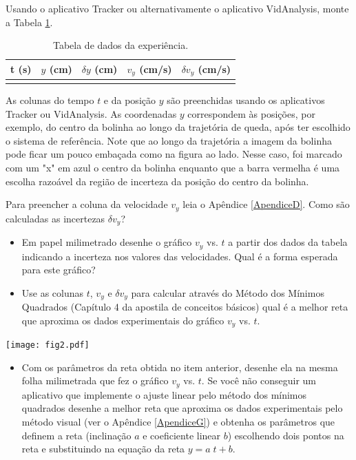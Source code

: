 \documentclass[12pt]{article}
\begin{document}
Usando o aplicativo Tracker ou alternativamente o aplicativo  VidAnalysis, monte a Tabela \ref{tabela1}.
\begin{table}[h!]
\centering
\begin{tabular}{c|c|c|c|c}
t (s) & $y$ (cm) & $\delta y$ (cm)& $v_y$ (cm/s)& $\delta v_y$ (cm/s)\\
\hline 
&&&& 
\end{tabular}
\caption{Tabela de dados da experiência.}
\label{tabela1}
\end{table}
\par
\begin{minipage}[c]{11.5cm}
\hskip 0.5cm
As colunas do tempo $t$ e da posição $y$ são preenchidas usando os aplicativos Tracker 
ou  VidAnalysis. As coordenadas $y$ correspondem às posições, por exemplo, do centro da bolinha ao longo da trajetória de queda, após ter escolhido o sistema de referência. Note que ao longo da trajetória a imagem da bolinha pode ficar um pouco embaçada como na figura ao lado. 
Nesse caso, foi marcado com um "x"  em azul 
o centro da bolinha enquanto que a barra vermelha é uma escolha razoável da região de incerteza
da posição do centro da bolinha.  
\par
\hskip 0.5cm
Para preencher a coluna da velocidade $v_y$ leia o Apêndice \ref{ApendiceD}. 
Como são calculadas as incertezas $\delta v_y$?
\par 
\begin{itemize}
\item Em papel milimetrado desenhe o gráfico $v_y$ vs. $t$ a partir dos dados da tabela indicando 
a incerteza nos valores das velocidades. Qual é a forma esperada para este gráfico?
\item Use as colunas $t$, $v_y$ e $\delta v_y$ para  calcular através do Método dos Mínimos Quadrados (Capítulo 4 da apostila de conceitos básicos) qual é a melhor reta que aproxima os dados experimentais do gráfico $v_y$ vs. $t$. 
\end{itemize}
\end{minipage}
\hskip 0.2cm
\begin{minipage}[c]{6cm}
\hskip 1cm
\texttt{[image: fig2.pdf]}
\label{fig2}
\end{minipage}
\begin{itemize}
\item Com os parâmetros da reta obtida no item anterior,  desenhe ela  na mesma folha milimetrada 
que fez o gráfico $v_y$ vs. $t$. Se você não conseguir um aplicativo que implemente o ajuste linear pelo método dos mínimos quadrados desenhe a melhor reta que aproxima os dados experimentais 
pelo método visual (ver o Apêndice \ref{ApendiceG}) e obtenha os parâmetros que definem a reta 
(inclinação $a$ e coeficiente linear $b$) escolhendo dois pontos na reta e substituindo na equação da reta $y=a\;t+b$.
\end{itemize}
  
\end{document}
